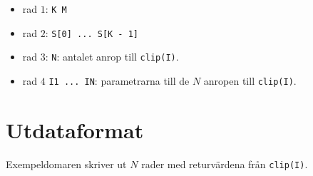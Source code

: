\begin{itemize}
  \item rad $1$: \texttt{K M}
  \item rad $2$: \texttt{S[0] ... S[K - 1]}
  \item rad $3$: \texttt{N}: antalet anrop till \texttt{clip(I)}.
  \item rad $4$ \texttt{I1 ... IN}: parametrarna till de $N$ anropen till \texttt{clip(I)}.
\end{itemize}

\section*{Utdataformat}
Exempeldomaren skriver ut $N$ rader med returvärdena från \texttt{clip(I)}.
